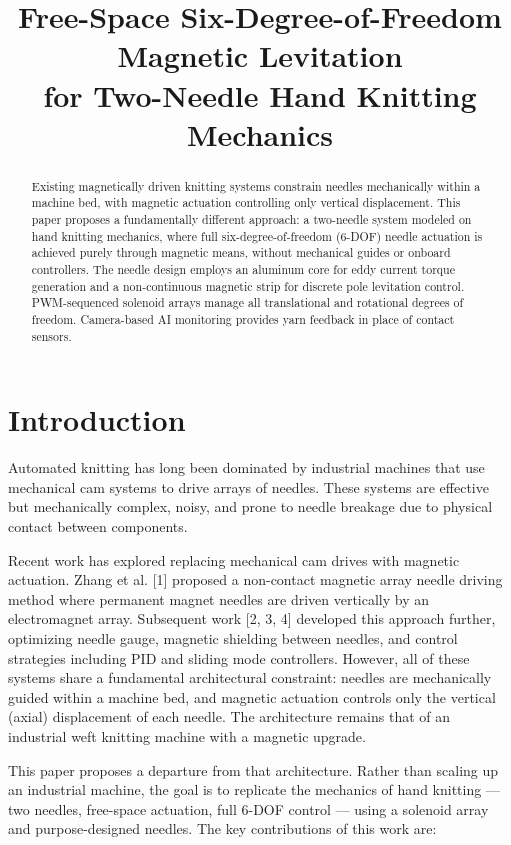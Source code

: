\documentclass[10pt]{article}
\title{Free-Space Six-Degree-of-Freedom Magnetic Levitation\\for Two-Needle Hand Knitting Mechanics}
\author{}
\date{}
\begin{document}
\maketitle

\begin{abstract}
Existing magnetically driven knitting systems constrain needles mechanically within a machine bed, with magnetic actuation controlling only vertical displacement. This paper proposes a fundamentally different approach: a two-needle system modeled on hand knitting mechanics, where full six-degree-of-freedom (6-DOF) needle actuation is achieved purely through magnetic means, without mechanical guides or onboard controllers. The needle design employs an aluminum core for eddy current torque generation and a non-continuous magnetic strip for discrete pole levitation control. PWM-sequenced solenoid arrays manage all translational and rotational degrees of freedom. Camera-based AI monitoring provides yarn feedback in place of contact sensors.
\end{abstract}

\section{Introduction}
Automated knitting has long been dominated by industrial machines that use mechanical cam systems to drive arrays of needles. These systems are effective but mechanically complex, noisy, and prone to needle breakage due to physical contact between components.

Recent work has explored replacing mechanical cam drives with magnetic actuation. Zhang et al. [1] proposed a non-contact magnetic array needle driving method where permanent magnet needles are driven vertically by an electromagnet array. Subsequent work [2, 3, 4] developed this approach further, optimizing needle gauge, magnetic shielding between needles, and control strategies including PID and sliding mode controllers. However, all of these systems share a fundamental architectural constraint: needles are mechanically guided within a machine bed, and magnetic actuation controls only the vertical (axial) displacement of each needle. The architecture remains that of an industrial weft knitting machine with a magnetic upgrade.

This paper proposes a departure from that architecture. Rather than scaling up an industrial machine, the goal is to replicate the mechanics of hand knitting --- two needles, free-space actuation, full 6-DOF control --- using a solenoid array and purpose-designed needles. The key contributions of this work are:
\end{document}
